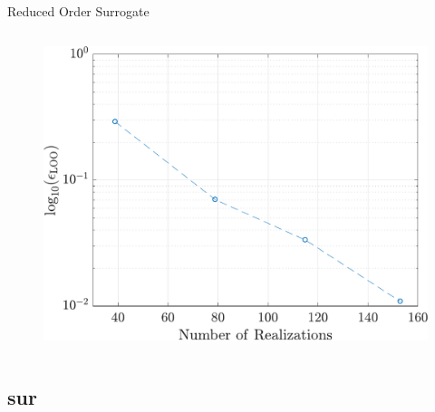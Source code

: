 \documentclass[xcolor={x11names,table},compress,svgnames,mathserif]{beamer}
\renewcommand{\(}{\begin{columns}}
\renewcommand{\)}{\end{columns}}
\newcommand{\<}[1]{\begin{column}{#1}}
\renewcommand{\>}{\end{column}}
\begin{document}
\begin{frame}{Reduced Order Surrogate}
\begin{columns}
\begin{column}{0.5\textwidth}
\vspace{-11mm}
\begin{center}
\begin{figure}[htbp]
  \includegraphics[width=1.0\textwidth]{./Figures/PCE5D_eloo}
  \end{figure}
\end{center}

\end{column}
\end{columns}

\end{frame}


\subsection{sur}
\end{document}
